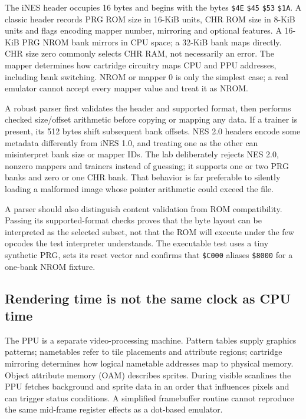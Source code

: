 \hypertarget{06-engine-ii-ch042-an-ines-file-describes-cartridge-memory-it-is-not-executable-code-itself}{}

The iNES header occupies 16 bytes and begins with the bytes \texttt{\$4E} \texttt{\$45} \texttt{\$53} \texttt{\$1A}. A classic header records PRG ROM size in 16-KiB units, CHR ROM size in 8-KiB units and flags encoding mapper number, mirroring and optional features. A 16-KiB PRG NROM bank mirrors in CPU space; a 32-KiB bank maps directly. CHR size zero commonly selects CHR RAM, not necessarily an error. The mapper determines how cartridge circuitry maps CPU and PPU addresses, including bank switching. NROM or mapper 0 is only the simplest case; a real emulator cannot accept every mapper value and treat it as NROM.

A robust parser first validates the header and supported format, then performs checked size/offset arithmetic before copying or mapping any data. If a trainer is present, its 512 bytes shift subsequent bank offsets. NES 2.0 headers encode some metadata differently from iNES 1.0, and treating one as the other can misinterpret bank size or mapper IDs. The lab deliberately rejects NES 2.0, nonzero mappers and trainers instead of guessing; it supports one or two PRG banks and zero or one CHR bank. That behavior is far preferable to silently loading a malformed image whose pointer arithmetic could exceed the file.

A parser should also distinguish content validation from ROM compatibility. Passing its supported-format checks proves that the byte layout can be interpreted as the selected subset, not that the ROM will execute under the few opcodes the test interpreter understands. The executable test uses a tiny synthetic PRG, sets its reset vector and confirms that \texttt{\$C000} aliases \texttt{\$8000} for a one-bank NROM fixture.

\subsection{Rendering time is not the same clock as CPU time}\label{06-engine-ii-ch042-rendering-time-is-not-the-same-clock-as-cpu-time}

\hypertarget{06-engine-ii-ch042-rendering-time-is-not-the-same-clock-as-cpu-time}{}

The PPU is a separate video-processing machine. Pattern tables supply graphics patterns; nametables refer to tile placements and attribute regions; cartridge mirroring determines how logical nametable addresses map to physical memory. Object attribute memory (OAM) describes sprites. During visible scanlines the PPU fetches background and sprite data in an order that influences pixels and can trigger status conditions. A simplified framebuffer routine cannot reproduce the same mid-frame register effects as a dot-based emulator.


